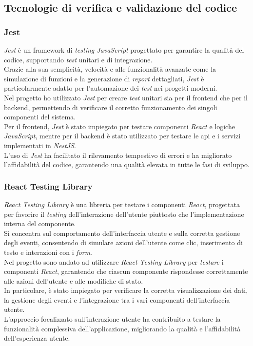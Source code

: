 \subsection{Tecnologie di verifica e validazione del codice}
\label{sez:tecnologie-validazione-codice}

\subsubsection{Jest}

\textit{Jest} è un framework di \textit{testing JavaScript} progettato per garantire la qualità del codice, supportando \textit{test} unitari e di integrazione.\\
Grazie alla sua semplicità, velocità e alle funzionalità avanzate come la simulazione di funzioni e la generazione di \textit{report} dettagliati, \textit{Jest} è particolarmente adatto per l'automazione dei \textit{test} nei progetti moderni.\\

\noindent Nel progetto ho utilizzato \textit{Jest} per creare \textit{test} unitari sia per il \gls{frontend} che per il \gls{backend}, permettendo di verificare il corretto funzionamento dei singoli componenti del sistema.\\
Per il \gls{frontend}, \textit{Jest} è stato impiegato per testare componenti \textit{React} e logiche  \textit{JavaScript}, mentre per il \gls{backend} è stato utilizzato per testare le \gls{api} e i servizi implementati in \textit{NestJS}.\\
L'uso di \textit{Jest} ha facilitato il rilevamento tempestivo di errori e ha migliorato l'affidabilità del codice, garantendo una qualità elevata in tutte le fasi di sviluppo.

\subsubsection{React Testing Library}
\textit{React Testing Library} è una libreria per testare i componenti \textit{React}, progettata per favorire il \textit{testing} dell'interazione dell'utente piuttosto che l'implementazione interna del componente. \\
Si concentra sul comportamento dell'interfaccia utente e sulla corretta gestione degli eventi, consentendo di simulare azioni dell'utente come clic, inserimento di testo e interazioni con i \textit{form}.\\

\noindent Nel progetto sono andato ad utilizzare \textit{React Testing Library} per \textit{testare} i componenti \textit{React}, garantendo che ciascun componente rispondesse correttamente alle azioni dell'utente e alle modifiche di stato. \\
In particolare, è stato impiegato per verificare la corretta visualizzazione dei dati, la gestione degli eventi e l'integrazione tra i vari componenti dell'interfaccia utente.\\ 
L'approccio focalizzato sull'interazione utente ha contribuito a testare la funzionalità complessiva dell'applicazione, migliorando la qualità e l'affidabilità dell'esperienza utente.

